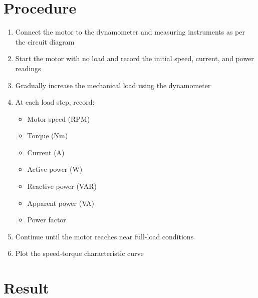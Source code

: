 \documentclass[a4paper,12pt]{article}
\begin{document}
	\section{Procedure}
	\begin{enumerate}
		\item Connect the motor to the dynamometer and measuring instruments as per the circuit diagram
		\item Start the motor with no load and record the initial speed, current, and power readings
		\item Gradually increase the mechanical load using the dynamometer
		\item At each load step, record:
		\begin{itemize}
			\item Motor speed (RPM)
			\item Torque (Nm)
			\item Current (A)
			\item Active power (W)
			\item Reactive power (VAR)
			\item Apparent power (VA)
			\item Power factor
		\end{itemize}
		\item Continue until the motor reaches near full-load conditions
		\item Plot the speed-torque characteristic curve
	\end{enumerate}
	
	\section{Result}
\begin{table}[H]
	\centering
	\caption{Experimental Data Table}
	\renewcommand{\arraystretch}{0.9}
\end{table}
\end{document}
